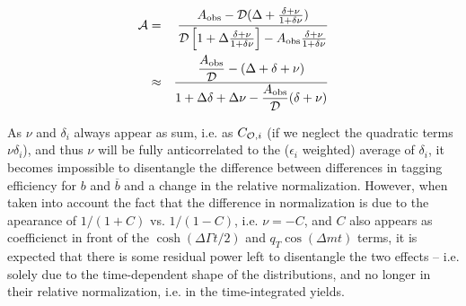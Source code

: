 \documentclass[a4paper,10pt,twosided]{article}
\begin{document}
\begin{eqnarray}
    {\cal A} &=& %
\frac{A_{\mathrm{obs}}-{\cal D}(\Delta+\frac{\delta+\nu }{1+\delta\nu})}{ {\cal D}\left[   1+\Delta\frac{\delta+\nu}{1+\delta\nu}\right]-A_{\mathrm{obs}}\frac{\delta+\nu}{1+\delta\nu} } 
\\ &\approx& \frac{ \dfrac{A_{\mathrm{obs}}}{\cal D}-(\Delta+\delta+\nu )}{   1+\Delta\delta+\Delta\nu- \dfrac{A_{\mathrm{obs}}}{\cal D}(\delta+\nu) } 
\end{eqnarray}

As $\nu$ and $\delta_i$ always appear as sum, i.e. as $C_{{\cal O},i}$ (if we neglect the quadratic terms $\nu\delta_i$), and thus $\nu$ will be fully anticorrelated to the ($\epsilon_i$ weighted) average of $\delta_i$,
it becomes impossible to disentangle the difference between differences in tagging efficiency for $b$ and $\overline{b}$
and a change in the relative normalization. However, when taken into account the fact that the difference in normalization
is due to the apearance of $1/(1+C)$ vs. $1/(1-C)$, i.e. $\nu = -C$, and $C$ also appears as coefficienct in front of the $\cosh\left(\Delta\Gamma t/2\right)$
and $q_T\cos(\Delta m t)$ terms, it is expected that there is some residual power left to disentangle the two effects -- i.e. 
solely due to the time-dependent shape of the distributions, and no longer in their relative normalization, i.e. in the time-integrated yields.
\end{document}
